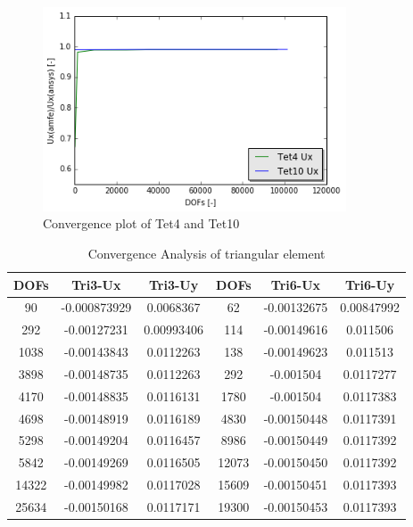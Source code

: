 \begin{figure}[htbp]
	\begin{center}	
		\includegraphics[width=9cm,clip]{TetConPlotUx.png}	 			
		\caption{Convergence plot of Tet4 and Tet10} \label{fig: TetConPlot}
	\end{center}
\end{figure}

\begin{table}[ht]
		\caption{Convergence Analysis of triangular element}
		\label{tab: TriConvergence}
\begin{tabular}{ c | c | c | c | c | c} 	
	DOFs & Tri3-Ux & Tri3-Uy & DOFs &Tri6-Ux & Tri6-Uy\\ \hline
	90 & -0.000873929 & 0.0068367 & 62 & -0.00132675 & 0.00847992  \\ 
	292 & -0.00127231 & 0.00993406 & 114 & -0.00149616 & 0.011506 \\
	1038 & -0.00143843 & 0.0112263 & 138 & -0.00149623 & 0.011513  \\
	3898 & -0.00148735 &  0.0112263&  292 & -0.001504 & 0.0117277 \\
	4170 & -0.00148835 &  0.0116131&  1780 & -0.001504 & 0.0117383\\
	4698 & -0.00148919 &  0.0116189& 4830 & -0.00150448 & 0.0117391  \\
	5298 & -0.00149204 &  0.0116457& 8986 & -0.00150449 & 0.0117392 \\
	5842 & -0.00149269 &  0.0116505&  12073 & -0.00150450 & 0.0117392\\
	14322 & -0.00149982 & 0.0117028& 15609 & -0.00150451 & 0.0117393 \\
	25634 & -0.00150168 & 0.0117171 & 19300 &  -0.00150453 &  0.0117393\\
	\hline  
\end{tabular}
\end{table}


